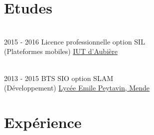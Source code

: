 \documentclass[letterpaper]{twentysecondcv} %
\begin{document}
\makeprofile %

\section{Etudes}

\begin{twenty} %
\\
	\twentyitem
    	{2015 - 2016}
        {}
        {Licence professionnelle option SIL \\ \textnormal{(Plateformes mobiles)}}
        {\href{https://iutweb.u-clermont1.fr/}{IUT d'Aubière}}
        {}
        {}
        
        \\
	\twentyitem
    	{2013 - 2015}
		{}
        {BTS SIO option SLAM \\ \textnormal{(Développement)}}
        {\href{https://www.lyceepeytavin.com/}{Lycée Emile Peytavin, Mende}}
        {}
        {}
\end{twenty}



\section{Expérience}
\end{document}
